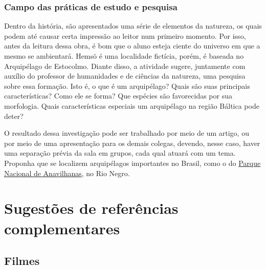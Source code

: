 \documentclass[12pt]{extarticle}
\begin{document}
\subsubsection{Campo das práticas de estudo e pesquisa}

Dentro da história, são apresentados uma série de elementos da
natureza, os quais podem até causar certa impressão ao leitor num
primeiro momento. Por isso, antes da leitura dessa obra, é bom que o
aluno esteja ciente do universo em que a mesmo se ambientará. Hemsö é
uma localidade fictícia, porém, é baseada no Arquipélago de Estocolmo.
Diante disso, a atividade sugere, juntamente com auxílio do professor de
humanidades e de ciências da natureza, uma pesquisa sobre essa formação.
Isto é, o que é um arquipélago? Quais são suas principais
características? Como ele se forma? Que espécies são favorecidas por sua
morfologia. Quais características especiais um arquipélago na região
Báltica pode deter? 

O resultado dessa investigação pode ser trabalhado
por meio de um artigo, ou por meio de uma apresentação para os demais
colegas, devendo, nesse caso, haver uma separação prévia da sala em
grupos, cada qual atuará com um tema. Proponha que se localizem arquipélagos
importantes no Brasil, como o do 
\href{https://pt.wikipedia.org/wiki/Parque_Nacional_de_Anavilhanas}{Parque Nacional de Anavilhanas}, no Rio Negro.




\section{Sugestões de referências complementares}\label{sugestoes}

\subsection{Filmes}
\end{document}
